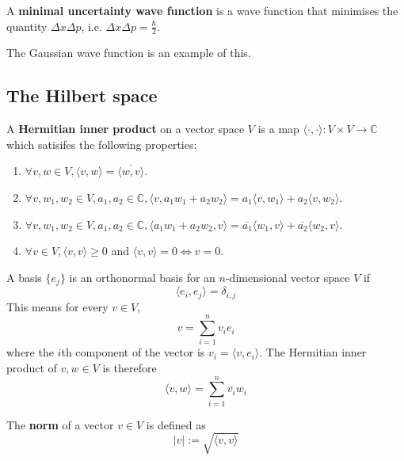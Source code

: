 \begin{definition}
	A \textbf{minimal uncertainty wave function} is a wave function that minimises the quantity $\Delta x \Delta p$, i.e. $\Delta x \Delta p = \frac{\hbar}{2}$.
	
	The Gaussian wave function is an example of this.
\end{definition}

\subsection{The Hilbert space}

\begin{definition}
	A \textbf{Hermitian inner product} on a vector space $V$ is a map $\langle \cdot, \cdot \rangle: V \times V \rightarrow \mathbb{C}$ which satisifes the following properties:
	\begin{enumerate}
		\item $\forall v, w \in V, \langle v, w \rangle = \overline{\langle w, v \rangle}$.
		\item $\forall v, w_1, w_2 \in V, a_1, a_2 \in \mathbb{C}, \langle v, a_1 w_1 + a_2 w_2 \rangle = a_1 \langle v, w_1 \rangle + a_2 \langle v, w_2 \rangle$.
		\item $\forall v, w_1, w_2 \in V, a_1, a_2 \in \mathbb{C}, \langle a_1 w_1 + a_2 w_2, v \rangle = \overline{a_1} \langle w_1, v \rangle + \overline{a_2} \langle w_2, v \rangle$.
		\item $\forall v \in V, \langle v, v \rangle \ge 0$ and $\langle v, v \rangle = 0 \Longleftrightarrow v = 0$.
	\end{enumerate}
\end{definition}

\begin{remark}
	A basis $\{ e_j \}$ is an orthonormal basis for an $n$-dimensional vector space $V$ if
	\[
		\langle e_i, e_j \rangle = \delta_{i, j}
	\]
	This means for every $v \in V$,
	\[
		v = \sum_{i = 1}^{n} v_i e_i
	\]
	where the $i$th component of the vector is $v_i = \langle v, e_i \rangle$. The Hermitian inner product of $v, w \in V$ is therefore
	\[
		\langle v, w \rangle = \sum_{i = 1}^{n} \overline{v_i} w_i
	\]
\end{remark}

\begin{definition}
	The \textbf{norm} of a vector $v \in V$ is defined as
	\[
		|v| := \sqrt{\langle v, v \rangle}
	\]
\end{definition}

